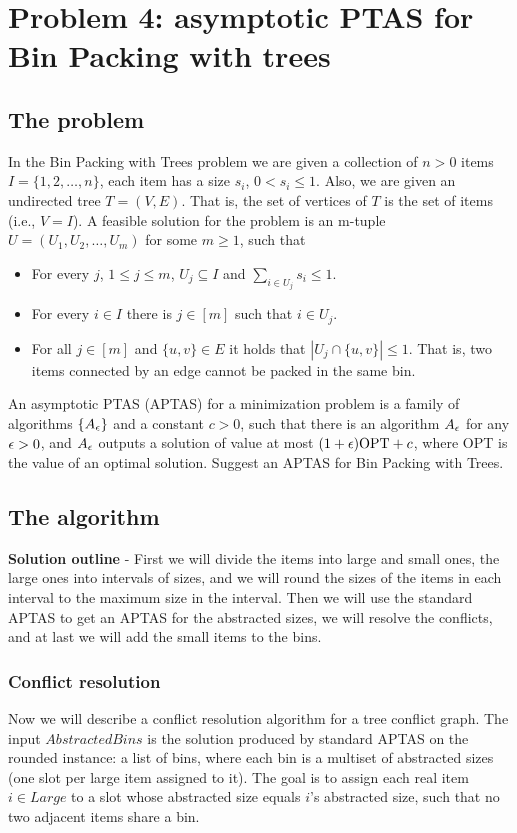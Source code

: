 \section*{Problem 4: asymptotic PTAS for Bin Packing with trees}
\subsection*{The problem}
In the Bin Packing with Trees problem we are given a collection of $n
> 0$ items $I = \{1, 2, \ldots, n\}$, each item has a size $s_i$, $0
< s_i \leq 1$. Also, we are given an undirected tree $T = (V, E)$.
That is, the set of vertices of $T$ is the set of items (i.e., $V =
I$). A feasible solution for the problem is an m-tuple $U = (U_1,
U_2, \ldots, U_m)$ for some $m \geq 1$, such that
\begin{itemize}
  \item For every $j$, $1 \leq j \leq m$, $U_j \subseteq I$ and
    $\sum_{i \in U_j} s_i \leq 1$.
  \item For every $i \in I$ there is $j \in [m]$ such that $i \in U_j$.
  \item For all $j \in [m]$ and $\{u, v\} \in E$ it holds that $|U_j
    \cap \{u, v\}| \leq 1$. That is, two items connected by an edge
    cannot be packed in the same bin.
\end{itemize}
An asymptotic PTAS (APTAS) for a minimization problem is a family of
algorithms $\{A_\epsilon\}$ and a constant $c > 0$, such that there is an
algorithm $A_\epsilon$ for any $\epsilon > 0$, and $A_\epsilon$ outputs a
solution of value at most $(1 + \epsilon)\text{OPT} + c$, where OPT is
the value of an optimal solution. Suggest an APTAS for Bin Packing with Trees.

\subsection*{The algorithm}
\textbf{Solution outline} - First we will divide the items into large and small ones, the large ones into intervals of sizes, and we will round the sizes of the items in each interval to the maximum size in the interval. Then we will use the standard APTAS to get an APTAS for the abstracted sizes, we will resolve the conflicts, and at last we will add the small items to the bins.

\subsubsection*{Conflict resolution}
Now we will describe a conflict resolution algorithm for a tree conflict graph. The input $AbstractedBins$ is the solution produced by standard APTAS on the rounded instance: a list of bins, where each bin is a multiset of abstracted sizes (one slot per large item assigned to it). The goal is to assign each real item $i \in Large$ to a slot whose abstracted size equals $i$'s abstracted size, such that no two adjacent items share a bin.

